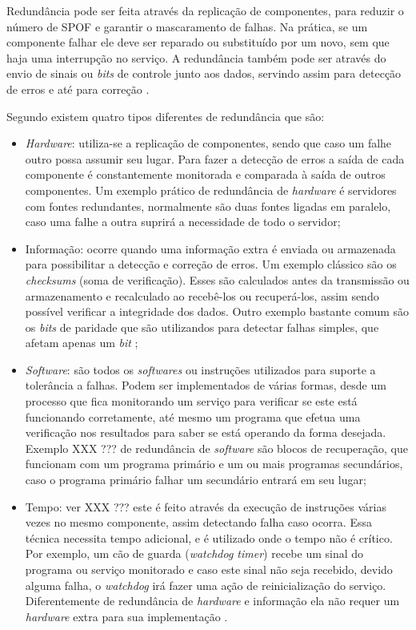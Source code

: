 Redundância pode ser feita através da replicação de componentes, para reduzir o número de SPOF e garantir o mascaramento de falhas.
Na prática, se um componente falhar ele deve ser reparado ou substituído por um novo, sem que haja uma interrupção no serviço.
A redundância também pode ser através do envio de sinais ou \textit{bits} de controle junto aos dados, 
servindo assim para detecção de erros e até para correção \cite{weber2002}.

Segundo \cite{norvag2000} existem quatro tipos diferentes de redundância que são:
\begin{itemize}
 \item \textit{Hardware}: utiliza-se a replicação de componentes, sendo que caso um falhe outro possa assumir seu lugar. 
 Para fazer a detecção de erros a saída de cada componente é constantemente monitorada e comparada à saída de outros componentes.
 Um exemplo prático de redundância de \textit{hardware} é servidores com fontes redundantes, normalmente são duas fontes ligadas em paralelo, 
 caso uma falhe a outra suprirá a necessidade de todo o servidor;
 \item Informação: ocorre quando uma informação extra é enviada ou armazenada para possibilitar a detecção e correção de erros.
 Um exemplo clássico são os \textit{checksums} (soma de verificação). Esses são calculados antes da transmissão ou armazenamento 
 e recalculado ao recebê-los ou recuperá-los, assim sendo possível verificar a integridade dos dados. Outro exemplo bastante comum são os 
 \textit{bits} de paridade que são utilizandos para detectar falhas simples, que afetam apenas um \textit{bit} \cite{weber2002};
 \item \textit{Software}: são todos os \textit{softwares} ou instruções utilizados para suporte a tolerância a falhas. Podem ser implementados
 de várias formas, desde um processo que fica monitorando um serviço para verificar se este está funcionando corretamente, até mesmo um programa
 que efetua uma verificação nos resultados para saber se está operando da forma desejada. Exemplo XXX ??? de redundância de \textit{software} são 
 blocos de recuperação, que funcionam com um programa primário e um ou mais programas secundários, caso o programa primário falhar um secundário
 entrará em seu lugar;
 \item Tempo: ver XXX ??? este é feito através da execução de instruções várias vezes no mesmo componente, assim detectando falha caso ocorra.
 Essa técnica necessita tempo adicional, e é utilizado onde o tempo não é crítico. Por exemplo, um cão de guarda (\textit{watchdog timer})
 recebe um sinal do programa ou serviço monitorado e caso este sinal não seja recebido, devido alguma falha, o \textit{watchdog} irá fazer 
 uma ação de reinicialização do serviço.
 Diferentemente de redundância de \textit{hardware} e informação ela não requer um \textit{hardware} extra para sua implementação \cite{costa2009}.
\end{itemize}

